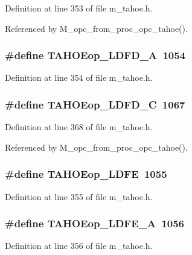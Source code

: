 Definition at line 353 of file m\_\-tahoe.h.

Referenced by M\_\-opc\_\-from\_\-proc\_\-opc\_\-tahoe().
\subsubsection{\setlength{\rightskip}{0pt plus 5cm}\#define TAHOEop\_\-LDFD\_\-A~1054}\label{m__tahoe_8h_b8bff64a62003ded9d696701d2fae97d}




Definition at line 354 of file m\_\-tahoe.h.
\subsubsection{\setlength{\rightskip}{0pt plus 5cm}\#define TAHOEop\_\-LDFD\_\-C~1067}\label{m__tahoe_8h_a799277fa1fbbb322fb7804f745a43b8}




Definition at line 368 of file m\_\-tahoe.h.

Referenced by M\_\-opc\_\-from\_\-proc\_\-opc\_\-tahoe().
\subsubsection{\setlength{\rightskip}{0pt plus 5cm}\#define TAHOEop\_\-LDFE~1055}\label{m__tahoe_8h_7bcdccd95fa41ec611a7a74f8a0cfd24}




Definition at line 355 of file m\_\-tahoe.h.
\subsubsection{\setlength{\rightskip}{0pt plus 5cm}\#define TAHOEop\_\-LDFE\_\-A~1056}\label{m__tahoe_8h_db8a0b7fabba2057baf99bdedd1827d0}




Definition at line 356 of file m\_\-tahoe.h.
